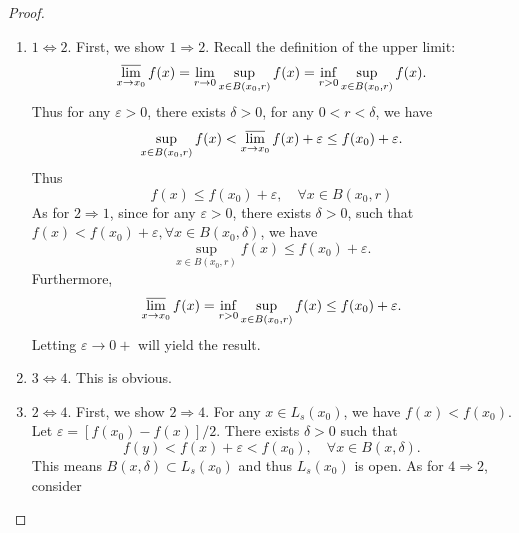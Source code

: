 \documentclass[12pt]{article}
\renewcommand{\(}{\left(}%
\renewcommand{\)}{\right)}%
\renewcommand{\[}{\left[}%
\renewcommand{\]}{\right]}%
\newtheorem{proof}{Proof.}}
\begin{document}
\begin{proof}
	\begin{enumerate}
		\item $1\Leftrightarrow 2$. First, we show $1\Rightarrow 2$. Recall the definition of the upper limit:
		\begin{equation*}
			\varlimsup_{x\to x_0}f(x)=\lim_{r\to0}\sup_{x\in B(x_0,r)}f(x)=\inf _{r>0}\sup_{x\in B(x_0,r)}f(x).
		\end{equation*}
		Thus for any $\varepsilon>0$, there exists $\delta>0$, for any $0<r<\delta$, we have
		\begin{equation*}
			\sup_{x\in B(x_0,r)}f(x)<\varlimsup_{x\to x_0}f(x)+\varepsilon\leq f(x_0)+\varepsilon.
		\end{equation*}
		Thus
		\begin{equation*}
			f(x)\leq f(x_0)+\varepsilon,\quad \forall x\in B(x_0,r)
		\end{equation*}
		As for $2\Rightarrow 1$, since for any $\varepsilon>0$, there exists $\delta>0$, such that $f(x)<f(x_0)+\varepsilon,\forall x\in B(x_0,\delta)$, we have
		\begin{equation*}
			\sup_{x\in B(x_0,r)}f(x)\leq f(x_0)+\varepsilon.
		\end{equation*}
		Furthermore, 
		\begin{equation*}
			\varlimsup_{x\to x_0}f(x)=\inf _{r>0}\sup_{x\in B(x_0,r)}f(x)\leq f(x_0)+\varepsilon.
		\end{equation*}
		Letting $\varepsilon\to0+$ will yield the result.
		\item $3\Leftrightarrow4$. This is obvious.
		\item $2\Leftrightarrow 4$. First, we show $2\Rightarrow 4$. For any $x\in L_s(x_0)$, we have $f(x)<f(x_0)$. Let $\varepsilon=[f(x_0)-f(x)]/2$. There exists $\delta>0$ such that 
		\begin{equation*}
			f(y)<f(x)+\varepsilon<f(x_0),\quad \forall x\in B(x,\delta).
		\end{equation*}
		This means $B(x,\delta)\subset L_s(x_0)$ and thus $L_s(x_0)$ is open. As for $4\Rightarrow 2$, consider 
	\end{enumerate}
\end{proof}
\end{document}
